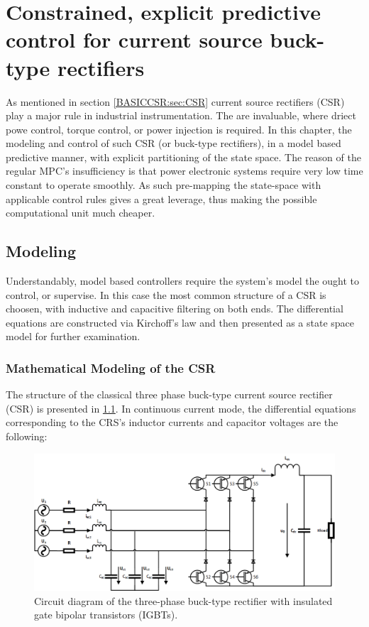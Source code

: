 \chapter[Predictive control of a CSR]{Constrained, explicit predictive control for current source buck-type rectifiers}\label{EMPC:sec:main}

As mentioned in section \ref{BASICCSR:sec:CSR} current source rectifiers (CSR) play a major rule in industrial instrumentation. The are invaluable, where driect powe control, torque control, or power injection is required. In this chapter, the modeling and control of such CSR (or buck-type rectifiers), in a model based predictive manner, with explicit partitioning of the state space. The reason of the regular MPC's insufficiency is that power electronic systems require very low time constant to operate smoothly. As such pre-mapping the state-space with applicable control rules gives a great leverage, thus making the possible computational unit much cheaper.
		
\section{Modeling}\label{EMPC:sec:Modeling}

Understandably, model based controllers require the system's model the ought to control, or supervise. In this case the most common structure of a CSR is choosen, with inductive and capacitive filtering on both ends. The differential equations are constructed via Kirchoff's law and then presented as a state space model for further examination.

\subsection{Mathematical Modeling of the CSR}\label{EMPC:sec:ModelofCSR}

    The structure of the classical three phase buck-type current source rectifier (CSR) is presented in \ref{EMPC:fig:network}. In continuous current mode, the differential equations corresponding to the CRS’s inductor currents and capacitor voltages are the following:

    \begin{figure}[!ht]
        \centering
        \includegraphics[width=\textwidth]{EMPC_PNG_Pics/circuit.png}
        \caption{Circuit diagram of the three-phase buck-type rectifier with insulated gate bipolar transistors (IGBTs).}
        \label{EMPC:fig:network}
    \end{figure}
		
